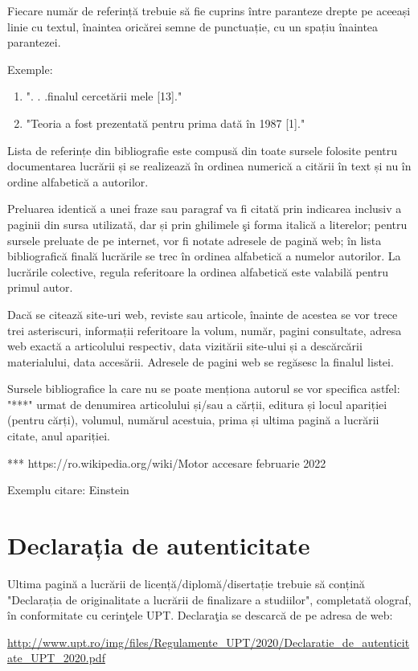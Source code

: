 Fiecare număr de referință trebuie să fie cuprins între paranteze drepte pe aceeași linie cu textul, înaintea oricărei semne de punctuație, cu un spațiu înaintea parantezei.

Exemple:
\begin{enumerate}[leftmargin=2cm,topsep=1.15pt,itemsep=1.15pt,partopsep=1.15pt,parsep=1.15pt,label=\alph*.]
   \item ". . .finalul cercetării mele [13]."
   \item "Teoria a fost prezentată pentru prima dată în 1987 [1]."
\end{enumerate}

Lista de referințe din bibliografie este compusă din toate sursele folosite pentru documentarea lucrării și se realizează în ordinea numerică a citării în text și nu în ordine alfabetică a autorilor.

Preluarea identică a unei fraze sau paragraf va fi citată prin indicarea inclusiv a paginii din sursa utilizată, dar și prin ghilimele şi forma italică a literelor; pentru sursele preluate de pe internet, vor fi notate adresele de pagină web; în lista bibliografică finală lucrările se trec în ordinea alfabetică a numelor autorilor. La lucrările colective, regula referitoare la ordinea alfabetică este valabilă pentru primul autor. 

Dacă se citează site-uri web, reviste sau articole, înainte de acestea se vor trece trei asteriscuri, informații referitoare la volum, număr, pagini consultate, adresa web exactă a articolului respectiv, data vizitării site-ului și a descărcării materialului, data accesării. Adresele de pagini web se regăsesc la finalul listei.

Sursele bibliografice la care nu se poate menționa autorul se vor specifica astfel: "***" urmat de denumirea articolului și/sau a cărții, editura și locul apariției (pentru cărți), volumul, numărul acestuia, prima și ultima pagină a lucrării citate, anul apariției. 

*** https://ro.wikipedia.org/wiki/Motor accesare februarie 2022

Exemplu citare: Einstein \cite{einstein}

\section{Declarația de autenticitate}
Ultima pagină a lucrării de licență/diplomă/disertație trebuie să conțină "Declarația de originalitate a lucrării de finalizare a studiilor", completată olograf, în conformitate cu cerinţele UPT. Declaraţia se descarcă de pe adresa de web: 

\url{http://www.upt.ro/img/files/Regulamente_UPT/2020/Declaratie_de_autenticitate_UPT_2020.pdf}